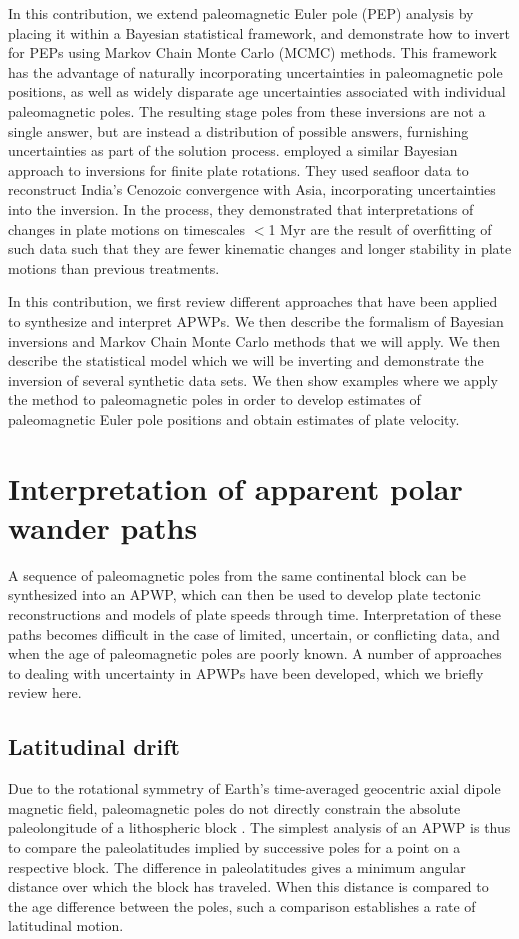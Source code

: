 \documentclass[11pt,letterpaper]{article}
\begin{document}
In this contribution, we extend paleomagnetic Euler pole (PEP) analysis by placing it within a Bayesian statistical framework, and demonstrate how to invert for PEPs using Markov Chain Monte Carlo (MCMC) methods. This framework has the advantage of naturally incorporating uncertainties in paleomagnetic pole positions, as well as widely disparate age uncertainties associated with individual paleomagnetic poles. The resulting stage poles from these inversions are not a single answer, but are instead a distribution of possible answers, furnishing uncertainties as part of the solution process. \citet{Iaffaldano2012a} employed a similar Bayesian approach to inversions for finite plate rotations. They used seafloor data to reconstruct India's Cenozoic convergence with Asia, incorporating uncertainties into the inversion. In the process, they demonstrated that interpretations of changes in plate motions on timescales $<$1 Myr are the result of overfitting of such data such that they are fewer kinematic changes and longer stability in plate motions than previous treatments.

In this contribution, we first review different approaches that have been applied to synthesize and interpret APWPs. We then describe the formalism of Bayesian inversions and Markov Chain Monte Carlo methods that we will apply. We then describe the statistical model which we will be inverting and demonstrate the inversion of several synthetic data sets. We then show examples where we apply the method to paleomagnetic poles in order to develop estimates of paleomagnetic Euler pole positions and obtain estimates of plate velocity.

\section*{Interpretation of apparent polar wander paths}

A sequence of paleomagnetic poles from the same continental block can be synthesized into an APWP, which can then be used to develop plate tectonic reconstructions and models of plate speeds through time. Interpretation of these paths becomes difficult in the case of limited, uncertain, or conflicting data, and when the age of paleomagnetic poles are poorly known. A number of approaches to dealing with uncertainty in APWPs have been developed, which we briefly review here.

\subsection*{Latitudinal drift}
Due to the rotational symmetry of Earth's time-averaged geocentric axial dipole magnetic field, paleomagnetic poles do not directly constrain the absolute paleolongitude of a lithospheric block \citep{Butler1992a}. The simplest analysis of an APWP is thus to compare the paleolatitudes implied by successive poles for a point on a respective block. The difference in paleolatitudes gives a minimum angular distance over which the block has traveled.  When this distance is compared to the age difference between the poles, such a comparison establishes a rate of latitudinal motion.
\end{document}

